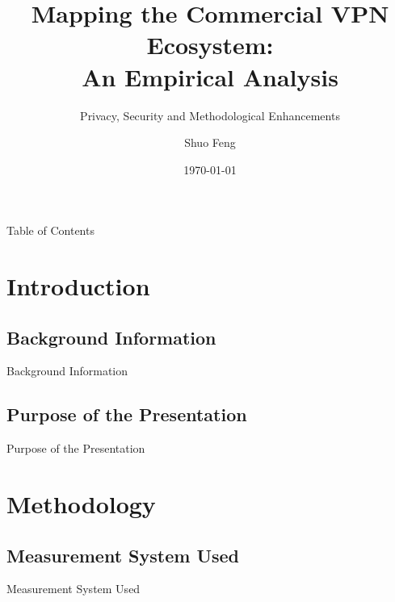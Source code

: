 \documentclass{beamer}
\title[Mapping the Commercial VPN Ecosystem]{
    Mapping the Commercial VPN Ecosystem:\\
    An Empirical Analysis
}
\subtitle[]{Privacy, Security and Methodological Enhancements}
\author[S. Feng]{Shuo Feng}
\institute[NIMS Lab]{NIMS Lab}
\date{\today}
\begin{document}
\frame{\titlepage}

\begin{frame}{Table of Contents}
  \tableofcontents
\end{frame}

\section{Introduction}

\subsection{Background Information}

\begin{frame}{Background Information}
\end{frame}

\subsection{Purpose of the Presentation}

\begin{frame}{Purpose of the Presentation}
\end{frame}

\section{Methodology}

\subsection{Measurement System Used}

\begin{frame}{Measurement System Used}
\end{frame}
\end{document}
